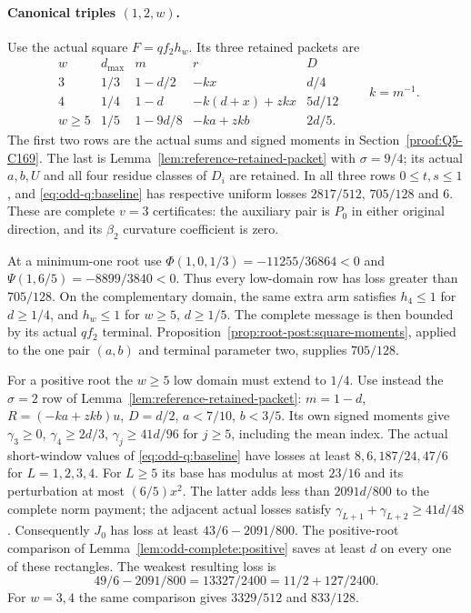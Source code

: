 \paragraph{Canonical triples $(1,2,w)$.}
Use the actual square $F=qf_2h_w$. Its three retained packets are
\[
\begin{array}{c|c|c|c|c}
 w&d_{\max}&m&r&D\\\hline
 3&1/3&1-d/2&-kx&d/4\\
 4&1/4&1-d&-k(d+x)+zkx&5d/12\\
 w\ge5&1/5&1-9d/8&-ka+zkb&2d/5.
\end{array}
\qquad k=m^{-1}.
\]
The first two rows are the actual sums and signed moments in
Section~\ref{proof:Q5-C169}. The last is
Lemma~\ref{lem:reference-retained-packet} with $\sigma=9/4$;
its actual $a,b,U$ and all four residue classes of $D_i$ are
retained. In all three rows $0\le t,s\le1$, and
\eqref{eq:odd-q:baseline} has respective uniform losses
$2817/512$, $705/128$ and $6$. These are complete $v=3$
certificates: the auxiliary pair is $P_0$ in either original
direction, and its $\beta_2$ curvature coefficient is zero.

At a minimum-one root use
$\Phi(1,0,1/3)=-11255/36864<0$ and
$\Psi(1,6/5)=-8899/3840<0$.
Thus every low-domain row has loss greater than $705/128$.
On the complementary domain, the same extra arm satisfies
$h_4\le1$ for $d\ge1/4$, and $h_w\le1$ for $w\ge5$, $d\ge1/5$.
The complete message is then bounded by its actual $qf_2$
terminal. Proposition~\ref{prop:root-post:square-moments}, applied
to the one pair $(a,b)$ and terminal parameter two, supplies $705/128$.

For a positive root the $w\ge5$ low domain must extend to $1/4$.
Use instead the $\sigma=2$ row of
Lemma~\ref{lem:reference-retained-packet}: $m=1-d$,
$R=(-ka+zkb)u$, $D=d/2$, $a<7/10$, $b<3/5$.
Its own signed moments give
$\gamma_3\ge0$, $\gamma_4\ge2d/3$,
$\gamma_j\ge41d/96$ for $j\ge5$, including the mean index.
The actual short-window values of \eqref{eq:odd-q:baseline}
have losses at least $8,6,187/24,47/6$ for $L=1,2,3,4$.
For $L\ge5$ its base has modulus at most $23/16$ and its
perturbation at most $(6/5)x^2$. The latter adds less than
$2091d/800$ to the complete norm payment; the adjacent actual
losses satisfy $\gamma_{L+1}+\gamma_{L+2}\ge41d/48$.
Consequently $J_0$ has loss at least $43/6-2091/800$.
The positive-root comparison of
Lemma~\ref{lem:odd-complete:positive} saves at least $d$ on
every one of these rectangles. The weakest resulting loss is
\begin{equation}\label{eq:odd-q:retained-margin}
 49/6-2091/800=13327/2400=11/2+127/2400.
\end{equation}
For $w=3,4$ the same comparison gives $3329/512$ and $833/128$.

